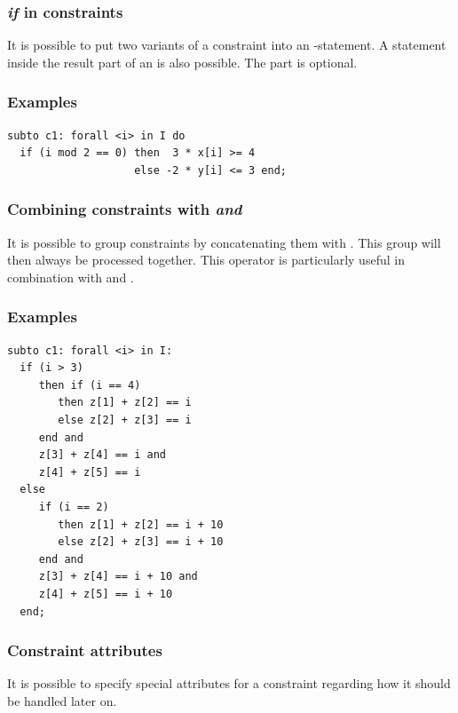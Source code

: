 \subsubsection{\emph{if} in constraints}
It is possible to put two variants of a constraint into an
-statement.
A  statement inside the result part of an  is
also possible. The  part is optional.

\subsubsection{Examples}
{\small
\begin{verbatim}
subto c1: forall <i> in I do
  if (i mod 2 == 0) then  3 * x[i] >= 4
                    else -2 * y[i] <= 3 end;
\end{verbatim}
}

\subsubsection{Combining constraints with \emph{and}}
It is possible to group constraints by concatenating them with
. This group will then always be processed together.
This operator is particularly useful in combination with  and .

\subsubsection{Examples}
{\small
\begin{verbatim}
subto c1: forall <i> in I:
  if (i > 3)
     then if (i == 4)
        then z[1] + z[2] == i
        else z[2] + z[3] == i
     end and
     z[3] + z[4] == i and
     z[4] + z[5] == i
  else
     if (i == 2)
        then z[1] + z[2] == i + 10
        else z[2] + z[3] == i + 10
     end and
     z[3] + z[4] == i + 10 and
     z[4] + z[5] == i + 10
  end;
\end{verbatim}
}


\subsubsection{Constraint attributes}
It is possible to specify special attributes for a constraint regarding
how it should be handled later on.

